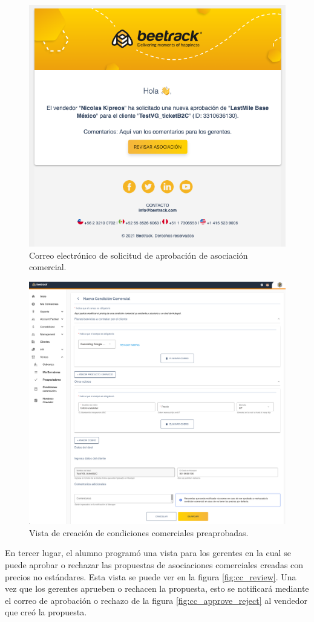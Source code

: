     \begin{figure}[H]
      \centering
      \includegraphics[width=0.6\linewidth]{figures/cc/mails/cc_mail_new.png}
      \caption{Correo electrónico de solicitud de aprobación de asociación comercial.}
      \label{fig:cc_mail_new}
    \end{figure}

    \begin{figure}[H]
      \centering
      \includegraphics[width=0.6\linewidth]{figures/cc/vistas/cc_new_sales_man.png}
      \caption{Vista de creación de condiciones comerciales preaprobadas.}
      \label{fig:cc_new_sales_man}
    \end{figure}

    En tercer lugar, el alumno programó una vista para los gerentes en la cual se puede aprobar o rechazar las propuestas de asociaciones comerciales creadas con precios no estándares. Esta vista se puede ver en la figura \ref{fig:cc_review}. Una vez que los gerentes aprueben o rechacen la propuesta, esto se notificará mediante el correo de aprobación o rechazo de la figura \ref{fig:cc_approve_reject} al vendedor que creó la propuesta.


